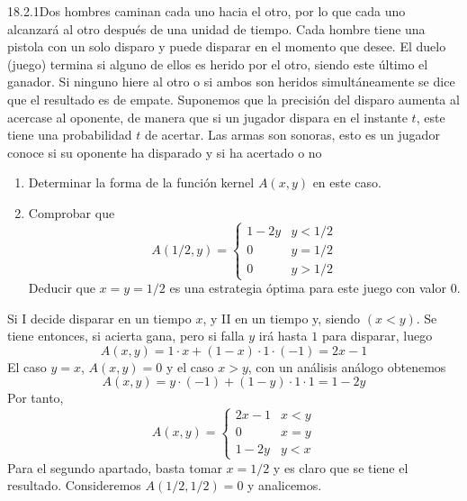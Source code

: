\documentclass[twoside]{article}
\begin{document}
\begin{ejercicio}{18.2.1}Dos hombres caminan cada uno hacia el otro, por lo que cada uno alcanzará al otro después de una unidad de tiempo. Cada hombre tiene una pistola con un solo disparo y puede disparar en el momento que desee. El duelo (juego) termina si alguno de ellos es herido por el otro, siendo este último el ganador. Si ninguno hiere al otro o si ambos son heridos simultáneamente se dice que el resultado es de empate. Suponemos que la precisión del disparo aumenta al acercase al oponente, de manera que si un jugador dispara en el instante $t$, este tiene una probabilidad $t$ de acertar. Las armas son sonoras, esto es un jugador conoce si su oponente ha disparado y si ha acertado o no

\begin{enumerate}
\item Determinar la forma de la función kernel $A(x,y)$ en este caso.
\item Comprobar que 
$$
A(1/2,y)= \begin{cases}
1-2y & y<1/2\\
0 & y=1/2\\
0 & y>1/2
\end{cases}
$$
Deducir que $x = y = 1/2$ es una estrategia óptima para este juego con valor $0$.
\end{enumerate}
\end{ejercicio}
\begin{solucion}
Si I decide disparar en un tiempo $x$, y II en un tiempo y, siendo $(x < y)$. Se tiene entonces, si acierta gana, pero si falla $y$ irá hasta $1$ para disparar, luego
$$
A(x,y) =1\cdot x + (1-x)\cdot 1 \cdot (-1) = 2x-1
$$
El caso $y=x$, $A(x,y)=0$ y el caso $x>y$, con un análisis análogo obtenemos
$$
A(x,y) = y\cdot (-1) + (1-y)\cdot 1 \cdot 1 = 1-2y
$$
Por tanto,
$$
A(x,y)= \begin{cases}
2x-1 & x<y\\
0 & x=y\\
1-2y & y<x
\end{cases}
$$
Para el segundo apartado, basta tomar $x=1/2$ y es claro que se tiene el resultado. Consideremos $A(1/2,1/2)=0$ y analicemos.
\end{solucion}
\end{document}

